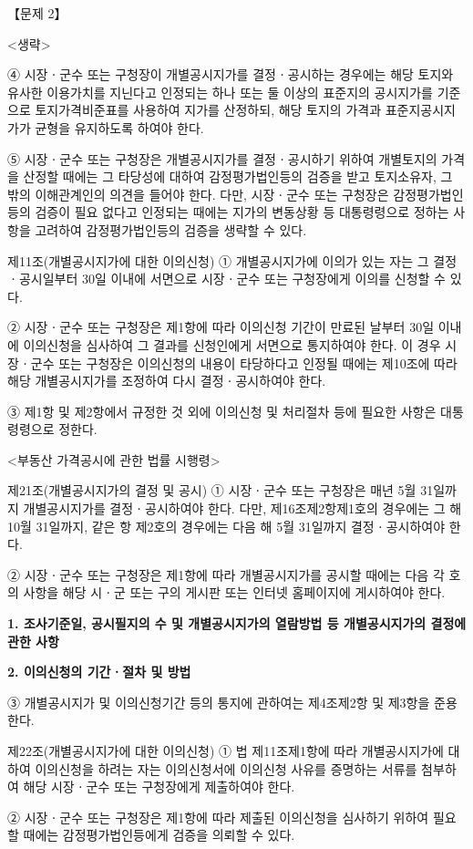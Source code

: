 \begin{longquestion}{【문제 2】}
\begin{framedtext}
<생략> \par
④ 시장ㆍ군수 또는 구청장이 개별공시지가를 결정ㆍ공시하는 경우에는 해당 토지와 유사한 이용가치를 지닌다고 인정되는 하나 또는 둘 이상의 표준지의 공시지가를 기준으로 토지가격비준표를 사용하여 지가를 산정하되, 해당 토지의 가격과 표준지공시지가가 균형을 유지하도록 하여야 한다. \par
⑤ 시장ㆍ군수 또는 구청장은 개별공시지가를 결정ㆍ공시하기 위하여 개별토지의 가격을 산정할 때에는 그 타당성에 대하여 감정평가법인등의 검증을 받고 토지소유자, 그 밖의 이해관계인의 의견을 들어야 한다. 다만, 시장ㆍ군수 또는 구청장은 감정평가법인등의 검증이 필요 없다고 인정되는 때에는 지가의 변동상황 등 대통령령으로 정하는 사항을 고려하여 감정평가법인등의 검증을 생략할 수 있다. \par
제11조(개별공시지가에 대한 이의신청) ① 개별공시지가에 이의가 있는 자는 그 결정ㆍ공시일부터 30일 이내에 서면으로 시장ㆍ군수 또는 구청장에게 이의를 신청할 수 있다. \par
② 시장ㆍ군수 또는 구청장은 제1항에 따라 이의신청 기간이 만료된 날부터 30일 이내에 이의신청을 심사하여 그 결과를 신청인에게 서면으로 통지하여야 한다. 이 경우 시장ㆍ군수 또는 구청장은 이의신청의 내용이 타당하다고 인정될 때에는 제10조에 따라 해당 개별공시지가를 조정하여 다시 결정ㆍ공시하여야 한다. \par
③ 제1항 및 제2항에서 규정한 것 외에 이의신청 및 처리절차 등에 필요한 사항은 대통령령으로 정한다. \par
<부동산 가격공시에 관한 법률 시행령> \par
제21조(개별공시지가의 결정 및 공시) ① 시장ㆍ군수 또는 구청장은 매년 5월 31일까지 개별공시지가를 결정ㆍ공시하여야 한다. 다만, 제16조제2항제1호의 경우에는 그 해 10월 31일까지, 같은 항 제2호의 경우에는 다음 해 5월 31일까지 결정ㆍ공시하여야 한다. \par
② 시장ㆍ군수 또는 구청장은 제1항에 따라 개별공시지가를 공시할 때에는 다음 각 호의 사항을 해당 시ㆍ군 또는 구의 게시판 또는 인터넷 홈페이지에 게시하여야 한다. \par
\textbf{1. 조사기준일, 공시필지의 수 및 개별공시지가의 열람방법 등 개별공시지가의 결정에 관한 사항} \par
\textbf{2. 이의신청의 기간ㆍ절차 및 방법} \par
③ 개별공시지가 및 이의신청기간 등의 통지에 관하여는 제4조제2항 및 제3항을 준용한다. \par
제22조(개별공시지가에 대한 이의신청) ① 법 제11조제1항에 따라 개별공시지가에 대하여 이의신청을 하려는 자는 이의신청서에 이의신청 사유를 증명하는 서류를 첨부하여 해당 시장ㆍ군수 또는 구청장에게 제출하여야 한다. \par
② 시장ㆍ군수 또는 구청장은 제1항에 따라 제출된 이의신청을 심사하기 위하여 필요할 때에는 감정평가법인등에게 검증을 의뢰할 수 있다. \par
\end{framedtext}
\end{longquestion}
